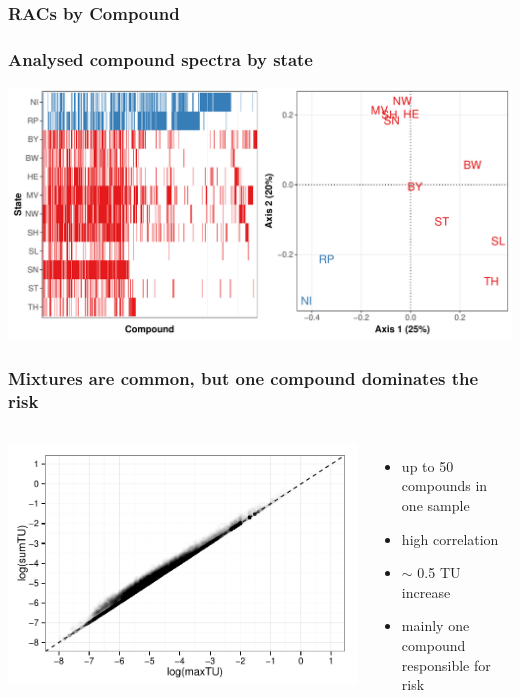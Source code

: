 \documentclass[
	12pt
	]{beamer}
\begin{document}
\begin{frame}
\frametitle{RACs by Compound}
\begingroup
\footnotesize %
	\begin{adjustbox}{max totalsize={\textwidth}{0.95\textheight}}
				
	\end{adjustbox}
\endgroup
\end{frame}


\begin{frame}
\frametitle{Analysed compound spectra by state}
	    	\includegraphics[width=\textwidth]{figs/spectra.pdf}
\end{frame}



\begin{frame}
\frametitle{Mixtures are common, but one compound dominates the risk}
	\begin{columns}
	    	\vspace{0.5cm}
	    	\includegraphics[width=1.2\textwidth, keepaspectratio]{figs/tusum_tumax.pdf}
	        \begin{itemize}
	        	\item up to 50 compounds in one sample
	        	\item high correlation
	        	\item $\sim$ 0.5 TU increase 
	        	\item mainly one compound responsible for risk
	        \end{itemize}
	\end{columns}
\end{frame}
\end{document}

